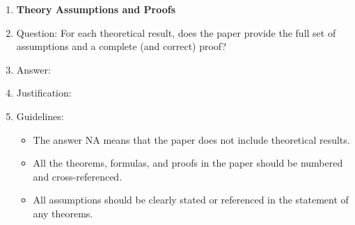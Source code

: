 \documentclass{article}
\begin{document}
\begin{enumerate}
\begin{itemize}
        \item The authors should reflect on the scope of the claims made, e.g., if the approach was only tested on a few datasets or with a few runs. In general, empirical results often depend on implicit assumptions, which should be articulated.
        \item The authors should reflect on the factors that influence the performance of the approach. For example, a facial recognition algorithm may perform poorly when image resolution is low or images are taken in low lighting. Or a speech-to-text system might not be used reliably to provide closed captions for online lectures because it fails to handle technical jargon.
        \item The authors should discuss the computational efficiency of the proposed algorithms and how they scale with dataset size.
        \item If applicable, the authors should discuss possible limitations of their approach to address problems of privacy and fairness.
        \item While the authors might fear that complete honesty about limitations might be used by reviewers as grounds for rejection, a worse outcome might be that reviewers discover limitations that aren't acknowledged in the paper. The authors should use their best judgment and recognize that individual actions in favor of transparency play an important role in developing norms that preserve the integrity of the community. Reviewers will be specifically instructed to not penalize honesty concerning limitations.
    \end{itemize}
\item {\bf Theory Assumptions and Proofs}
    \item[] Question: For each theoretical result, does the paper provide the full set of assumptions and a complete (and correct) proof?
    \item[] Answer: \answerNA{}
    \item[] Justification: \justificationTODO{}
    \item[] Guidelines:
    \begin{itemize}
        \item The answer NA means that the paper does not include theoretical results.
        \item All the theorems, formulas, and proofs in the paper should be numbered and cross-referenced.
        \item All assumptions should be clearly stated or referenced in the statement of any theorems.

\end{itemize}
\end{enumerate}
\end{document}
